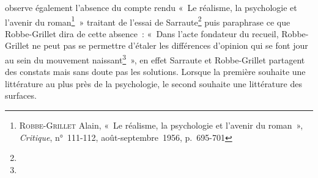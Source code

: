 \documentclass[12pt, a4paper]{article}
\begin{document}
\galia{} observe également l'absence du compte rendu «~Le réalisme, la psychologie et l’avenir du roman\footnote{\textsc{Robbe-Grillet} Alain, «~Le réalisme, la psychologie et l’avenir du roman~», \textit{Critique}, n°~111-112, août-septembre~1956, p.~695-701}~» traitant de l'essai de Sarraute\footnote{} puis paraphrase ce que Robbe-Grillet dira de cette absence~: «~Dans l’acte fondateur du recueil, Robbe-Grillet ne peut pas se permettre d’étaler les différences d’opinion qui se font jour au sein du mouvement naissant\footnote{}~», en effet Sarraute et Robbe-Grillet partagent des constats mais sans doute pas les solutions. Lorsque la première souhaite une littérature au plus près de la psychologie, le second souhaite une littérature des surfaces. 
    
\end{document}
